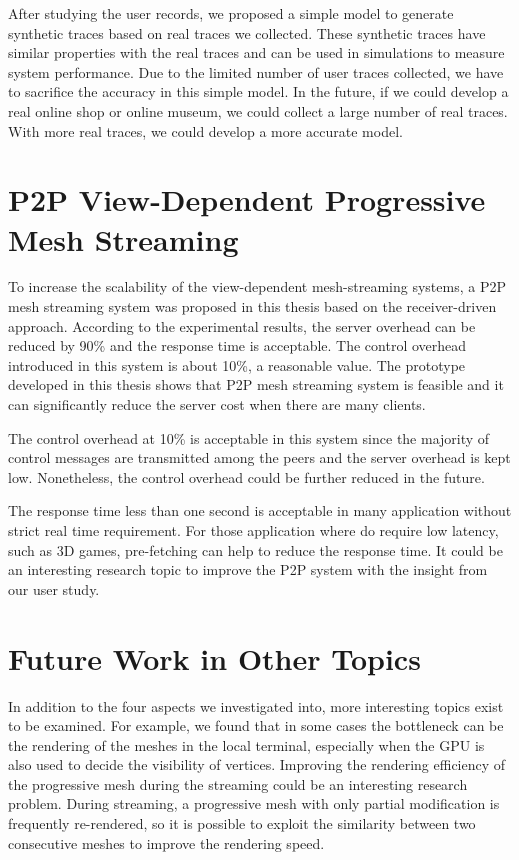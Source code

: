 After studying the user records, we proposed a simple model 
to generate synthetic traces based on real traces we collected. 
These synthetic traces have similar properties with the real traces and 
can be used in simulations to measure system performance.
Due to the limited number of user traces collected, we have to 
sacrifice the accuracy in this simple model. In the future, if we could develop a real 
online shop or online museum, we could collect a large number of real traces.
With more real traces, we could develop a more accurate model.

\section{P2P View-Dependent Progressive Mesh Streaming}
To increase the scalability of the view-dependent mesh-streaming systems, 
a P2P mesh streaming system was proposed in this thesis based on the receiver-driven approach. 
According to the experimental results, the server overhead can be reduced by 90\%
and the response time is acceptable. %
The control overhead introduced in this system is about 10\%, a reasonable value. 
The prototype developed in this thesis shows that P2P mesh streaming system is feasible
and it can significantly reduce the server cost when there are many clients.

The control overhead at 10\% is acceptable in this system since the majority of
control messages are transmitted among the peers and the server overhead is kept low. 
Nonetheless, the control overhead could be further reduced in the future. 

The response time less than one second is acceptable in many application without 
strict real time requirement. For those application where do require low latency, such
as 3D games, pre-fetching can help to reduce the response time. It could be an interesting 
research topic to improve the P2P system with the insight from our user study.

\section{Future Work in Other Topics}
In addition to the four aspects we investigated into, more interesting topics exist to be examined.
For example, we found that in some cases the bottleneck can be the rendering of the meshes in the local 
terminal, especially when the GPU is also used to decide the visibility of vertices. 
Improving the rendering efficiency of the progressive mesh during the streaming 
could be an interesting research problem.  
During streaming, a progressive mesh with only partial modification is frequently re-rendered, 
so it is possible to exploit the similarity between two consecutive meshes to improve the rendering speed.

